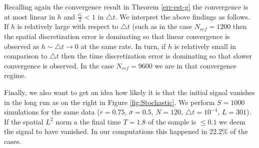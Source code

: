 \documentclass[a4paper,10pt]{article}
\numberwithin{equation}{section}
\begin{document}
Recalling again the convergence result in Theorem \ref{err-est-g} the convergence is at most linear in $h$ and $\frac{\nu_r}{2} < 1$ in $\triangle t$. We interpret the above findings as follows. If $h$ is relatively large with respect to $\triangle t$ (such as in the case $N_{ref} = 1200$ then the spatial discretization error is dominating so that linear convergence is observed as $h \sim \triangle t \to 0$ at the same rate. In turn, if $h$ is relatively small in comparison to $\triangle t$ then the time discretization error is dominating so that slower convergence is observed. In the case $N_{ref} = 9600$ we are in that convergence regime.


Finally, we also want to get an idea how likely it is that the initial signal vanishes in the long run as on the right in Figure \ref{fig:Stochastic}. We perform $S = 1000$ simulations for the same data ($\bar{r} = 0.75$, $\bar{\sigma} = 0.5$, $N = 120$, $\triangle t = 10^{-4}$, $L = 301$). If the spatial $L^2$ norm a the final time $T = 1.8$ of the sample is $\leq 0.1$ we deem the signal to have vanished. In our computations this happened in 22.2\% of the cases.




\end{document}

